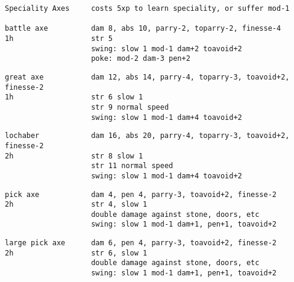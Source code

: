 \goodbreak \small \begin{samepage} \begin{verbatim}
Speciality Axes     costs 5xp to learn speciality, or suffer mod-1

battle axe          dam 8, abs 10, parry-2, toparry-2, finesse-4
1h                  str 5
                    swing: slow 1 mod-1 dam+2 toavoid+2
                    poke: mod-2 dam-3 pen+2
\end{verbatim} \blocklistgap \begin{verbatim}
great axe           dam 12, abs 14, parry-4, toparry-3, toavoid+2, finesse-2
1h                  str 6 slow 1
                    str 9 normal speed
                    swing: slow 1 mod-1 dam+4 toavoid+2
\end{verbatim} \blocklistgap \begin{verbatim}
lochaber            dam 16, abs 20, parry-4, toparry-3, toavoid+2, finesse-2
2h                  str 8 slow 1
                    str 11 normal speed
                    swing: slow 1 mod-1 dam+4 toavoid+2
\end{verbatim} \blocklistgap \begin{verbatim}
pick axe            dam 4, pen 4, parry-3, toavoid+2, finesse-2
2h                  str 4, slow 1
                    double damage against stone, doors, etc
                    swing: slow 1 mod-1 dam+1, pen+1, toavoid+2
\end{verbatim} \blocklistgap \begin{verbatim}
large pick axe      dam 6, pen 4, parry-3, toavoid+2, finesse-2
2h                  str 6, slow 1
                    double damage against stone, doors, etc
                    swing: slow 1 mod-1 dam+1, pen+1, toavoid+2
\end{verbatim} \end{samepage} \normalsize \goodbreak

\


